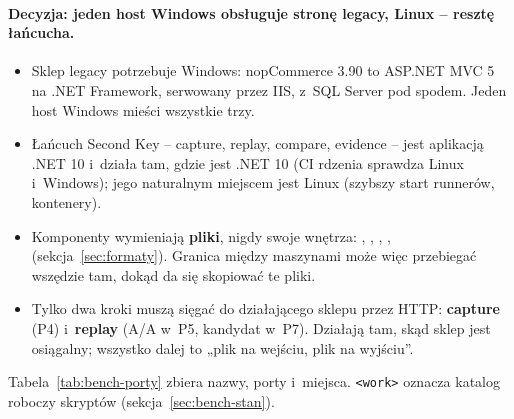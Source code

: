 \paragraph{Decyzja: jeden host Windows obsługuje stronę legacy, Linux -- resztę łańcucha.}
\begin{itemize}
  \item Sklep legacy potrzebuje Windows: nopCommerce 3.90 to ASP.NET MVC 5 na .NET
    Framework, serwowany przez IIS, z~SQL Server pod spodem. Jeden host Windows mieści
    wszystkie trzy.
  \item Łańcuch Second Key -- capture, replay, compare, evidence -- jest aplikacją .NET 10
    i~działa tam, gdzie jest .NET 10 (CI rdzenia sprawdza Linux i~Windows); jego naturalnym
    miejscem jest Linux (szybszy start runnerów, kontenery).
  \item Komponenty wymieniają \textbf{pliki}, nigdy swoje wnętrza: ,
    , , , 
    (sekcja~\ref{sec:formaty}). Granica między maszynami może więc przebiegać wszędzie
    tam, dokąd da się skopiować te pliki.
  \item Tylko dwa kroki muszą sięgać do działającego sklepu przez HTTP: \textbf{capture}
    (P4) i~\textbf{replay} (A/A w~P5, kandydat w~P7). Działają tam, skąd sklep jest
    osiągalny; wszystko dalej to „plik na wejściu, plik na wyjściu”.
\end{itemize}

Tabela~\ref{tab:bench-porty} zbiera nazwy, porty i~miejsca. \texttt{<work>} oznacza
katalog roboczy skryptów (sekcja~\ref{sec:bench-stan}).

